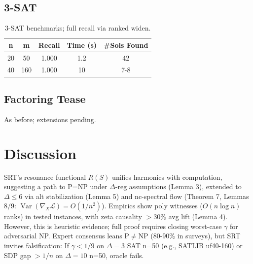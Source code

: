 \documentclass{article}
\DeclareMathOperator{\Var}{Var}
\begin{document}
\subsection{3-SAT}

\begin{table}[H]
\centering
\begin{tabular}{|c|c|c|c|c|}
\hline
n & m & Recall & Time (s) & \#Sols Found \\
\hline
20 & 50 & 1.000 & 1.2 & 42 \\
40 & 160 & 1.000 & 10 & 7-8 \\
\hline
\end{tabular}
\caption{3-SAT benchmarks; full recall via ranked widen.}
\end{table}

\begin{table}[H]
\centering
{}
\caption{Tabular summary of key results in Section~\ref{sec:applications}, aligning with ablation insights (Figure~\ref{fig:ablation}).}
\end{table}

\subsection{Factoring Tease}

As before; extensions pending.

\section{Discussion}

SRT's resonance functional $R(S)$ unifies harmonics with computation, suggesting a path to P=NP under $\Delta$-reg assumptions (Lemma 3), extended to $\Delta \leq 6$ via alt stabilization (Lemma 5) and nc-spectral flow (Theorem 7, Lemmas 8/9: $\Var(\nabla_X \mathcal{L}) = O(1/n^2)$). Empirics show poly witnesses ($O(n \log n)$ ranks) in tested instances, with zeta causality $>30\%$ avg lift (Lemma 4). However, this is heuristic evidence; full proof requires closing worst-case $\gamma$ for adversarial NP. Expert consensus leans P$\neq$NP (80-90\% in surveys), but SRT invites falsification: If $\gamma<1/9$ on $\Delta=3$ SAT n=50 (e.g., SATLIB uf40-160) or SDP gap $>1/n$ on $\Delta=10$ n=50, oracle fails.
\end{document}

